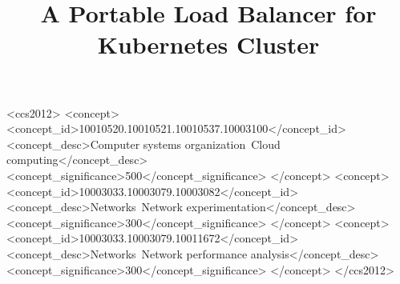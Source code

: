 \documentclass[sigconf]{acmart}
\begin{document}
\title{A Portable Load Balancer for Kubernetes Cluster}




%
%

\begin{CCSXML}
<ccs2012>
<concept>
<concept_id>10010520.10010521.10010537.10003100</concept_id>
<concept_desc>Computer systems organization~Cloud computing</concept_desc>
<concept_significance>500</concept_significance>
</concept>
<concept>
<concept_id>10003033.10003079.10003082</concept_id>
<concept_desc>Networks~Network experimentation</concept_desc>
<concept_significance>300</concept_significance>
</concept>
<concept>
<concept_id>10003033.10003079.10011672</concept_id>
<concept_desc>Networks~Network performance analysis</concept_desc>
<concept_significance>300</concept_significance>
</concept>
</ccs2012>
\end{CCSXML}





\maketitle




 
\end{document}
